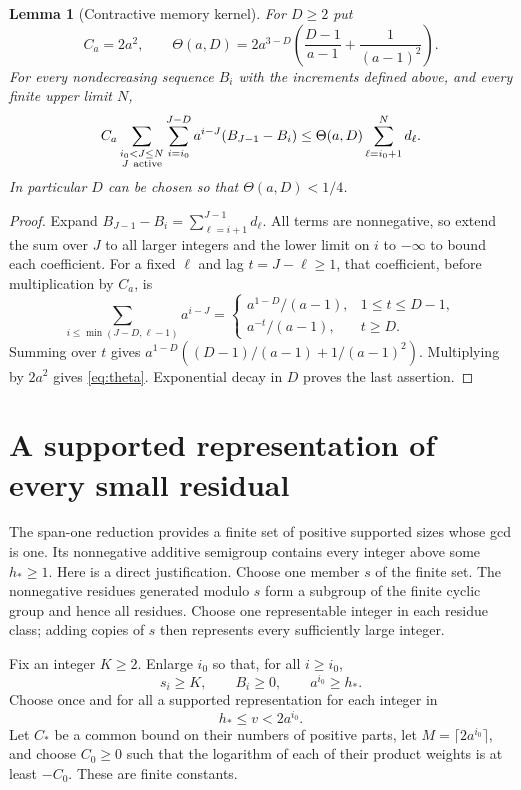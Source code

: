 \documentclass[11pt]{amsart}
\newtheorem{lemma}[theorem]{Lemma}
\theoremstyle{remark}\newtheorem{remark}[theorem]{Remark}
\begin{document}
\begin{lemma}[Contractive memory kernel]\label{lem:kernel}
For $D\ge2$ put
\begin{equation}\label{eq:theta}
 C_a=2a^2,\qquad
 \Theta(a,D)=2a^{3-D}
 \left(\frac{D-1}{a-1}+\frac{1}{(a-1)^2}\right).
\end{equation}
For every nondecreasing sequence $B_i$ with the increments defined above,
and every finite upper limit $N$,
\begin{equation}\label{eq:kernelsum}
 C_a\sum_{\substack{i_0<J\le N\\J\ {\rm active}}}
       \sum_{i=i_0}^{J-D}a^{i-J}(B_{J-1}-B_i)
 \le\Theta(a,D)\sum_{\ell=i_0+1}^{N}d_\ell.
\end{equation}
In particular $D$ can be chosen so that $\Theta(a,D)<1/4$.
\end{lemma}

\begin{proof}
Expand $B_{J-1}-B_i=\sum_{\ell=i+1}^{J-1}d_\ell$. All terms are
nonnegative, so extend the sum over $J$ to all larger integers and the
lower limit on $i$ to $-\infty$ to bound each coefficient. For a fixed
$\ell$ and lag $t=J-\ell\ge1$, that coefficient, before multiplication by
$C_a$, is
\[
 \sum_{i\le\min(J-D,\ell-1)}a^{i-J}
 =\begin{cases}
  a^{1-D}/(a-1),&1\le t\le D-1,\\
  a^{-t}/(a-1),&t\ge D.
 \end{cases}
\]
Summing over $t$ gives
$a^{1-D}((D-1)/(a-1)+1/(a-1)^2)$. Multiplying by $2a^2$ gives
\eqref{eq:theta}. Exponential decay in $D$ proves the last assertion.
\end{proof}

\section{A supported representation of every small residual}\label{sec:residual}
The span-one reduction provides a finite set of positive supported sizes
whose gcd is one. Its nonnegative additive semigroup contains every integer
above some $h_*\ge1$. Here is a direct justification. Choose one member
$s$ of the finite set. The nonnegative residues generated modulo $s$ form
a subgroup of the finite cyclic group and hence all residues. Choose one
representable integer in each residue class; adding copies of $s$ then
represents every sufficiently large integer.

Fix an integer $K\ge2$. Enlarge $i_0$ so that, for all $i\ge i_0$,
\begin{equation}\label{eq:start}
 s_i\ge K,\qquad B_i\ge0,\qquad a^{i_0}\ge h_*.
\end{equation}
Choose once and for all a supported representation for each integer in
\[
 h_*\le v<2a^{i_0}.
\]
Let $C_*$ be a common bound on their numbers of positive parts, let
$M=\lceil2a^{i_0}\rceil$, and choose $C_0\ge0$ such that the logarithm of
each of their product weights is at least $-C_0$. These are finite constants.
\end{document}
